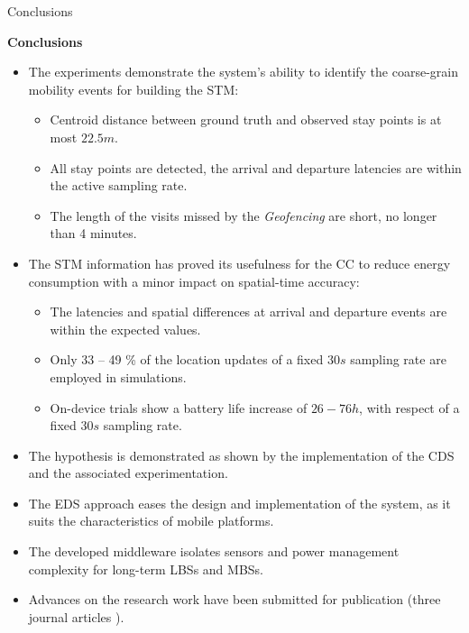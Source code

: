 \begin{frame}{Conclusions}{}
\small 
\begin{block}{\small \textbf{Conclusions}}
\begin{itemize}
  \item The experiments demonstrate the system's ability to identify the coarse-grain mobility events for building the STM: %
  \begin{itemize}
  	\item Centroid distance between ground truth and observed stay points is at most $22.5 m$.
  	\item All stay points are detected, the arrival and departure latencies are within the active sampling rate.
  	\item The length of the visits missed by the \emph{Geofencing} are short, no longer than 4 minutes.
  \end{itemize}
  
  \item The STM information has proved its usefulness for the CC to reduce energy consumption with a minor impact on spatial-time accuracy: %

  \begin{itemize}
  	\item The latencies and spatial differences at arrival and departure events are within the expected values.
  	\item Only 33 – 49 \% of the location updates of a fixed $30 s$ sampling rate are employed in simulations.
  	\item On-device trials show a battery life increase of $26 - 76 h$, with respect of a fixed $30 s$ sampling rate.
  \end{itemize}

  \item The hypothesis is demonstrated as shown by the implementation of the CDS and the associated experimentation. %
  \item The EDS approach eases the design and implementation of the system, as it suits the characteristics of mobile platforms. %
  \item The developed middleware isolates sensors and power management complexity for long-term LBSs and MBSs.
  \item Advances on the research work have been submitted for publication (three journal articles \cite{Perez-Torres2016,Perez-Torres2016b,Perez-Torres2018}).
\end{itemize}
\end{block}
\end{frame}



